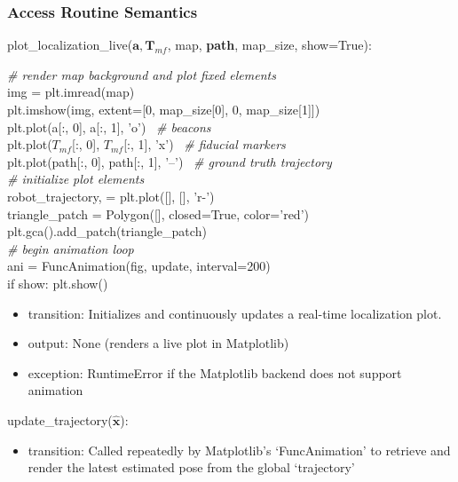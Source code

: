 \documentclass[12pt, titlepage]{article}
\begin{document}
\subsubsection{Access Routine Semantics}

\noindent plot\_localization\_live($\mathbf{a}, \mathbf{T}_{mf}$, map, \textbf{path}, map\_size, show=True):

\noindent \textit{\# render map background and plot fixed elements} \\
img = plt.imread(map) \\
plt.imshow(img, extent=[0, map\_size[0], 0, map\_size[1]]) \\
plt.plot(a[:, 0], a[:, 1], 'o') \ \textit{\# beacons} \\
plt.plot($T_{mf}$[:, 0], $T_{mf}$[:, 1], 'x') \ \textit{\# fiducial markers} \\
plt.plot(path[:, 0], path[:, 1], '--') \ \textit{\# ground truth trajectory} \\

\noindent \textit{\# initialize plot elements} \\
robot\_trajectory, = plt.plot([], [], 'r-') \\
triangle\_patch = Polygon([], closed=True, color='red') \\
plt.gca().add\_patch(triangle\_patch) \\

\noindent \textit{\# begin animation loop} \\
ani = FuncAnimation(fig, update, interval=200) \\
if show: plt.show()

\begin{itemize}
  \item transition: Initializes and continuously updates a real-time localization plot.
  \item output: None (renders a live plot in Matplotlib)
  \item exception: RuntimeError if the Matplotlib backend does not support animation
\end{itemize}

\noindent update\_trajectory($\hat{\mathbf{x}}$):
\begin{itemize}
\item transition: Called repeatedly by Matplotlib's `FuncAnimation' to retrieve and render the latest estimated pose from the global `trajectory'
\end{itemize}
\end{document}
